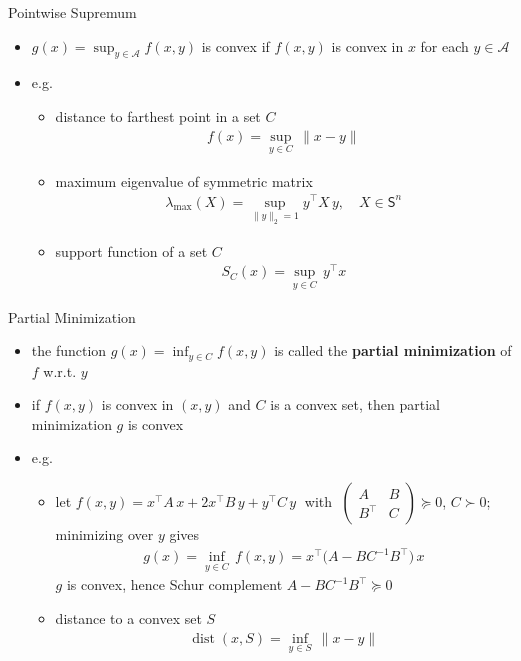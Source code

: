 \documentclass[10pt]{beamer}
\newcommand{\ds}{\displaystyle}
\DeclareMathOperator*{\dist}{dist}
\theoremstyle{definition}
\begin{document}
\begin{frame}{Pointwise Supremum}

\begin{itemize}
  \item $\ds g(x) = \sup_{y\in\mathcal{A}}f(x, y)$ is convex if $f(x, y)$ is convex in $x$ for each $y\in\mathcal{A}$
  \item e.g.
    \begin{itemize}
      \item distance to farthest point in a set $C$
        \begin{align*}
          f(x) = \sup_{y\in C}\,\|x - y\|
        \end{align*}
      \item maximum eigenvalue of symmetric matrix 
        \begin{align*}
          \lambda_{\text{max}}(X) = \sup_{\|y\|_2 = 1} y^\top X\,y, \quad X\in\mathsf{S}^n 
        \end{align*}
      \item support function of a set $C$
        \begin{align*}
          S_C(x) = \sup_{y\in C}\,y^\top x
        \end{align*}
    \end{itemize}
\end{itemize}

\end{frame}

\begin{frame}{Partial Minimization}

\begin{itemize}
  \item the function $\ds g(x) = \inf_{y\in C} f(x, y)$ is called the {\bf partial minimization} of $f$ w.r.t. $y$
  \item if $f(x, y)$ is convex in $(x, y)$ and $C$ is a convex set, then partial minimization $g$ is convex
  \item e.g.
    \begin{itemize}
      \item let $f(x, y) = x^\top A\,x + 2 x^\top B\,y + y^\top C\,y\;$ with $\ds\;\begin{pmatrix}A & B \\ B^\top & C\end{pmatrix}\succcurlyeq 0$, $C\succ 0$; minimizing over $y$ gives 
        \begin{align*}
          g(x) = \inf_{y\in C}\,f(x, y) = x^\top\big(A - BC^{-1}B^\top\big)\,x
        \end{align*}
        $g$ is convex, hence Schur complement $A - BC^{-1}B^\top\succcurlyeq 0$
      \item distance to a convex set $S$
        \begin{align*}
          \dist(x, S) = \inf_{y\in S}\,\|x - y\|
        \end{align*}
    \end{itemize}
\end{itemize}

\end{frame}
\end{document}
